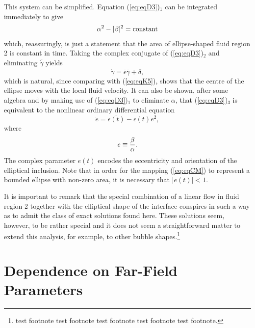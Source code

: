\documentclass[fleqn]{jleo}
\begin{document}
This system can be simplified. Equation (\ref{eq:eqD3})$_{1}$ can be integrated immediately to give
\begin{equation}
\alpha^2 - |\beta|^2 = {\rm constant}
\label{eq:eqF1}
\end{equation}
which, reassuringly, is just a statement that the area  of ellipse-shaped
fluid region 2 is constant in time. Taking the complex conjugate of (\ref{eq:eqD3})$_{2}$ and eliminating $\overline{\dot \gamma}$ yields
\begin{equation}
\dot \gamma = \bar \epsilon \bar \gamma + \bar \delta,
\label{eq:eqF2}
\end{equation}
which is natural, since comparing with (\ref{eq:eqK5}),  shows   that the
centre of the ellipse moves with the local fluid velocity. It can also be
shown, after some algebra and by making use of (\ref{eq:eqD3})$_{1}$
to eliminate $\dot \alpha$, that (\ref{eq:eqD3})$_{3}$
is equivalent to the nonlinear ordinary differential equation
\begin{equation}
\dot e = \overline{\epsilon(t)} - \epsilon(t) e^2,\label{eq:eqRic}
\end{equation}
where 
\begin{equation}
e \equiv {\beta \over \alpha}.
\end{equation}
The complex parameter $e(t)$ encodes the eccentricity and orientation of
the elliptical inclusion. Note that in order for the mapping (\ref{eq:eqCM})
to represent a bounded ellipse with non-zero area, it is necessary that $|e(t)| < 1$.

It is important to remark that the special
combination of a linear flow in fluid region 2 together with the
elliptical shape of the interface conspires in such a way as
to admit the class of exact solutions found here. These solutions
seem, however, to be rather special and it does not seem
a straightforward matter to extend this analysis, for example, to other
bubble shapes.\footnote{test footnote test footnote test footnote test footnote
test footnote.}

\section{Dependence on Far-Field Parameters}
\end{document}

